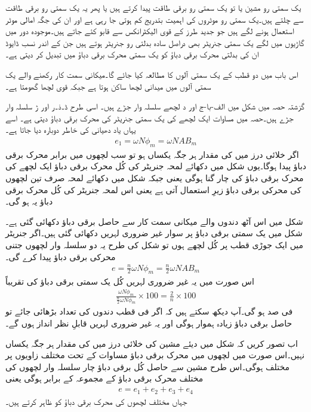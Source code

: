 یک سمتی رو مشین یا تو یک سمتی رو برقی طاقت پیدا کرتے ہیں یا پھر یہ یک سمتی رو برقی طاقت سے چلتے ہیں۔یک سمتی رو موٹروں کی اہمیت بتدریج کم ہوتی جا رہی ہے اور ان کی جگہ امالی موٹر استعمال ہونے لگے ہیں جو جدید طرز کے قوی الیکٹرانکس سے قابو کئے جاتے ہیں۔موجودہ دور میں گاڑیوں میں لگے یک سمتی جنریٹر بھی دراصل سادہ بدلتی رو جنریٹر ہوتے ہیں جن کے اندر نسب ڈایوڈ ان کی بدلتی محرک برقی دباؤ کو یک سمتی محرک برقی دباؤ میں تبدیل کر دیتی ہے۔

اس باب میں دو قطب کے یک سمتی آلوں کا مطالعہ کیا جائے گا۔میکانی سمت کار رکھنے والے یک سمتی آلوں میں میدانی لچھا ساکن ہوتا ہے جبکہ قوی لچھا گھومتا ہے۔

گزشتہ حصہ میں شکل  میں الف-با-ج اور د لچھے سلسلہ وار جڑے ہیں۔ اسی طرح ڈ۔ذ۔ر اور ڑ سلسلہ وار جڑے ہیں۔حصہ  میں مساوات  ایک لچھے کی یک سمتی جنریٹر کی محرک برقی دباؤ  دیتی ہے۔ اسے یہاں یاد دھیانی کی خاطر دوبارہ دیا جاتا ہے۔
\begin{align}
e_1=\omega N \phi_m=\omega N A B_m
\end{align}
اگر خلائی درز میں  کی مقدار ہر جگہ یکساں ہو تو سب لچھوں میں برابر محرک برقی دباؤ پیدا ہوگا۔یوں شکل  میں دکھائے لمحہ جنریٹر کی کُل محرک برقی دباؤ  ایک لچھے کی محرک برقی دباؤ کی چار گنا ہوگی یعنی
  جبکہ شکل  میں دکھائے لمحہ صرف تین لچھوں کی محرکی برقی دباؤ زیرِ استعمال آتی ہے یعنی اس لمحہ جنریٹر کی کُل محرک برقی دباؤ یہ   ہو گی۔

شکل  میں اس آٹھ دندوں والے میکانی سمت کار سے حاصل برقی دباؤ دکھائی گئی ہے۔شکل میں یک سمتی برقی دباؤ پر سوار غیر ضروری لہریں دکھائی گئی ہیں۔اگر جنریٹر میں ایک جوڑی قطب پر کُل  لچھے ہوں تو شکل  کی طرح یہ دو   سلسلہ وار لچھوں جتنی محرکی برقی دباؤ پیدا کرے گی۔
\begin{align}
e=\frac{n}{2} \omega N \phi_m=\frac{n}{2} \omega N A B_m
\end{align}
اس صورت میں یہ غیر ضروری لہریں کُل یک سمتی برقی دباؤ کی تقریباً
\begin{align}
\frac{\omega N \phi_m}{\frac{n}{2} \omega N \phi_m} \times 100=\frac{2}{n} \times 100
\end{align}
فی صد ہو گی۔آپ دیکھ سکتے ہیں کہ اگر فی قطب دندوں کی تعداد بڑھائی جائے تو حاصل برقی دباؤ زیادہ ہموار ہوگی اور یہ غیر ضروری لہریں قابلِ نظر انداز ہوں گے۔

اب تصور کریں کہ شکل  میں دیئے مشین کی خلائی درز میں  کی مقدار ہر جگہ یکساں نہیں۔اس صورت میں لچھوں میں محرک برقی دباؤ مساوات  کے تحت مختلف زاویوں پر مختلف ہوگی۔اس طرح مشین سے حاصل کُل برقی دباؤ چار سلسلہ وار لچھوں کی مختلف محرک برقی دباؤ کے مجموعہ کے برابر ہوگی یعنی
\begin{align}
e=e_1+e_2+e_3+e_4
\end{align}
جہاں   مختلف لچھوں کی محرک برقی دباؤ کو ظاہر کرتے ہیں۔

